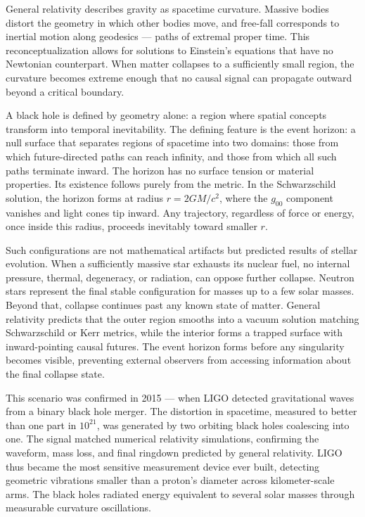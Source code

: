 General relativity describes gravity as spacetime curvature. Massive bodies distort the geometry in which other bodies move, and free-fall corresponds to inertial motion along geodesics — paths of extremal proper time. This reconceptualization allows for solutions to Einstein's equations that have no Newtonian counterpart. When matter collapses to a sufficiently small region, the curvature becomes extreme enough that no causal signal can propagate outward beyond a critical boundary.


A black hole is defined by geometry alone: a region where spatial concepts transform into temporal inevitability. The defining feature is the event horizon: a null surface that separates regions of spacetime into two domains: those from which future-directed paths can reach infinity, and those from which all such paths terminate inward. The horizon has no surface tension or material properties. Its existence follows purely from the metric. In the Schwarzschild solution, the horizon forms at radius $r = 2GM/c^2$, where the $g_{00}$ component vanishes and light cones tip inward. Any trajectory, regardless of force or energy, once inside this radius, proceeds inevitably toward smaller $r$. 

Such configurations are not mathematical artifacts but predicted results of stellar evolution. When a sufficiently massive star exhausts its nuclear fuel, no internal pressure, thermal, degeneracy, or radiation, can oppose further collapse. Neutron stars represent the final stable configuration for masses up to a few solar masses. Beyond that, collapse continues past any known state of matter. General relativity predicts that the outer region smooths into a vacuum solution matching Schwarzschild or Kerr metrics, while the interior forms a trapped surface with inward-pointing causal futures. The event horizon forms before any singularity becomes visible, preventing external observers from accessing information about the final collapse state.


This scenario was confirmed in 2015 — when LIGO detected gravitational waves from a binary black hole merger. The distortion in spacetime, measured to better than one part in $10^{21}$, was generated by two orbiting black holes coalescing into one. The signal matched numerical relativity simulations, confirming the waveform, mass loss, and final ringdown predicted by general relativity. LIGO thus became the most sensitive measurement device ever built, detecting geometric vibrations smaller than a proton's diameter across kilometer-scale arms. The black holes radiated energy equivalent to several solar masses through measurable curvature oscillations.


